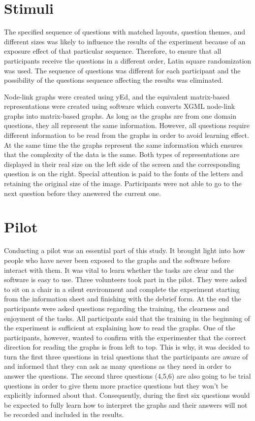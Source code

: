 \documentclass{l4proj}
\begin{document}
\section{Stimuli}
The specified sequence of questions with matched layouts, question themes, and different sizes was likely to influence the results of the experiment because of an exposure effect of that particular sequence. Therefore, to ensure that all participants receive the questions in a different order, Latin square randomization was used. The sequence of questions was different for each participant and the possibility of the questions sequence affecting the results was eliminated.
  
Node-link graphs were created using yEd, and the equivalent matrix-based representations were created using software which converts XGML node-link graphs into matrix-based graphs. As long as the graphs are from one domain questions, they all represent the same information. However, all questions require different information to be read from the graphs in order to avoid learning effect. At the same time the the graphs represent the same information which ensures that the complexity of the data is the same. Both types of representations are displayed in their real size on the left side of the screen and the corresponding question is on the right. Special attention is paid to the fonts of the letters and retaining the original size of the image. Participants were not able to go to the next question before they answered the current one. 



\section{Pilot}

Conducting a pilot was an essential part of this study. It brought light into how people who have never been exposed to the graphs and the software before interact with them. It was vital to learn whether the tasks are clear and the software is easy to use. Three volunteers took part in the pilot. They were asked to sit on a chair in a silent environment and complete the experiment starting from the information sheet and finishing with the debrief form. At the end the participants were asked questions regarding the training, the clearness and enjoyment of the tasks. All participants said that the training in the beginning of the experiment is sufficient at explaining how to read the graphs. One of the participants, however, wanted to confirm with the experimenter that the correct direction for reading the graphs is from left to top. This is why, it was decided to turn the first three questions in trial questions that the participants are aware of and informed that they can ask as many questions as they need in order to answer the questions. The second three questions (4,5,6) are also going to be trial questions in order to give them more practice questions but they won't be explicitly informed about that. Consequently, during the first six questions would be expected to fully learn how to interpret the graphs and their answers will not be recorded and included in the results. 
\end{document}
